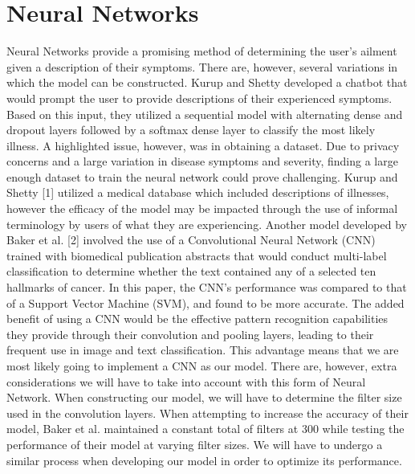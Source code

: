 \documentclass[12pt, final, onecolumn, comsoc, conference]{IEEEtran}
\begin{document}
\section{Neural Networks} Neural Networks provide a promising method of
determining the user’s ailment given a description of their symptoms. There are,
however, several variations in which the model can be constructed. Kurup and
Shetty developed a chatbot that would prompt the user to provide descriptions of
their experienced symptoms. Based on this input, they utilized a sequential
model with alternating dense and dropout layers followed by a softmax dense
layer to classify the most likely illness. A highlighted issue, however, was in
obtaining a dataset. Due to privacy concerns and a large variation in disease
symptoms and severity, finding a large enough dataset to train the neural
network could prove challenging. Kurup and Shetty [1] utilized a medical
database which included descriptions of illnesses, however the efficacy of the
model may be impacted through the use of informal terminology by users of what
they are experiencing. Another model developed by Baker et al. [2] involved the
use of a Convolutional Neural Network (CNN) trained with biomedical publication
abstracts that would conduct multi-label classification to determine whether the
text contained any of a selected ten hallmarks of cancer. In this paper, the
CNN’s performance was compared to that of a Support Vector Machine (SVM), and
found to be more accurate. The added benefit of using a CNN would be the
effective pattern recognition capabilities they provide through their
convolution and pooling layers, leading to their frequent use in image and text
classification. This advantage means that we are most likely going to implement
a CNN as our model. There are, however, extra considerations we will have to
take into account with this form of Neural Network. When constructing our model,
we will have to determine the filter size used in the convolution layers. When
attempting to increase the accuracy of their model, Baker et al. maintained a
constant total of filters at 300 while testing the performance of their model at
varying filter sizes. We will have to undergo a similar process when developing
our model in order to optimize its performance.
\end{document}
